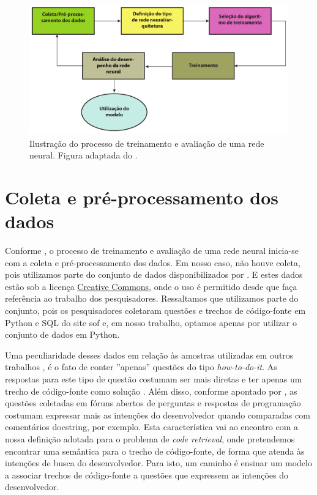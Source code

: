 \begin{figure}[H]
\centering
\includegraphics[width=1\textwidth]{figuras/cap-experimento/neural_network_training_lifecycle_dissertation.pdf}
\caption{Ilustração do processo de treinamento e avaliação de uma rede neural. Figura adaptada do \cite{nndesign:2014:pratical-training-issues}.} 
\label{fig:training-neural-network-cyclic}
\end{figure}

\section{Coleta e pré-processamento dos dados}
\label{sec:coleta-pre-processamento-dos-dados}

Conforme \cite{nndesign:2014:pratical-training-issues}, o processo de treinamento e avaliação de uma rede neural inicia-se com a coleta e pré-processamento dos dados. Em nosso caso, não houve coleta, pois utilizamos parte do conjunto de dados disponibilizados por \cite{yao-2018}. E estes dados estão sob a licença \href{https://creativecommons.org/licenses/by/4.0/}{Creative Commons}, onde o uso é permitido desde que faça referência ao trabalho dos pesquisadores. Ressaltamos que utilizamos parte do conjunto, pois os pesquisadores coletaram questões e trechos de código-fonte em Python e SQL do site \Gls{sof} e, em nosso trabalho, optamos apenas por utilizar o conjunto de dados em Python. 

 Uma peculiaridade desses dados em relação às amostras utilizadas em outros trabalhos \cite{iyer-etal-2016-summarizing, Allamanis-bimodal-source-code-natural-language:2015}, é o fato de conter ''apenas'' questões do tipo \textit{how-to-do-it}. As respostas para este tipo de questão costumam ser mais diretas e ter apenas um trecho de código-fonte como solução \citep{yao-2018}. Além disso, conforme apontado por \cite{cambronero-deep-learning-code-search:2019}, as questões coletadas em fóruns abertos de perguntas e respostas de programação costumam expressar mais as intenções do desenvolvedor quando comparadas com comentários \gls{docstring}, por exemplo. Esta característica vai  ao encontro com a nossa definição adotada para o problema de \textit{code retrieval}, onde pretendemos encontrar uma semântica para o trecho de código-fonte, de forma que atenda às intenções de busca do desenvolvedor. Para isto, um caminho é ensinar um modelo a associar trechos de código-fonte a questões que expressem as intenções do desenvolvedor.

